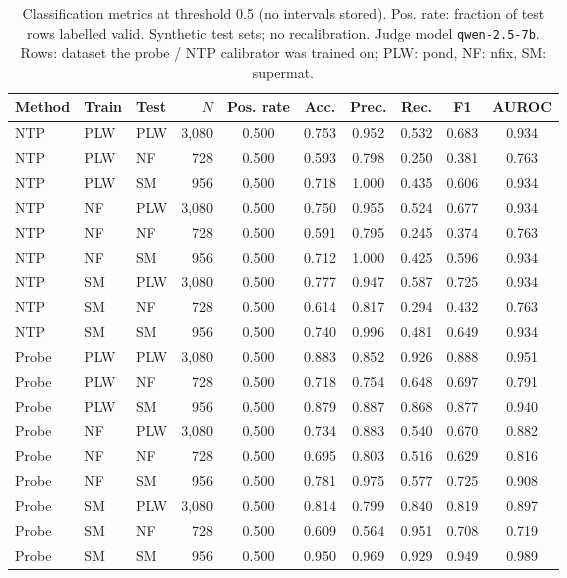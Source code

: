\begin{table}[t]
\centering
\small
\caption{Classification metrics at threshold 0.5 (no intervals stored). Pos. rate: fraction of test rows labelled valid. Synthetic test sets; no recalibration. Judge model \texttt{qwen-2.5-7b}. Rows: dataset the probe / NTP calibrator was trained on; PLW: pond, NF: nfix, SM: supermat.}
\label{tab:calibration-syn-classification}
\begin{tabular}{lllrcccccc}
\toprule
Method & Train & Test & $N$ & Pos. rate & Acc. & Prec. & Rec. & F1 & AUROC \\
\midrule
NTP & PLW & PLW & 3{,}080 & 0.500 & 0.753 & 0.952 & 0.532 & 0.683 & 0.934 \\
NTP & PLW & NF & 728 & 0.500 & 0.593 & 0.798 & 0.250 & 0.381 & 0.763 \\
NTP & PLW & SM & 956 & 0.500 & 0.718 & 1.000 & 0.435 & 0.606 & 0.934 \\
NTP & NF & PLW & 3{,}080 & 0.500 & 0.750 & 0.955 & 0.524 & 0.677 & 0.934 \\
NTP & NF & NF & 728 & 0.500 & 0.591 & 0.795 & 0.245 & 0.374 & 0.763 \\
NTP & NF & SM & 956 & 0.500 & 0.712 & 1.000 & 0.425 & 0.596 & 0.934 \\
NTP & SM & PLW & 3{,}080 & 0.500 & 0.777 & 0.947 & 0.587 & 0.725 & 0.934 \\
NTP & SM & NF & 728 & 0.500 & 0.614 & 0.817 & 0.294 & 0.432 & 0.763 \\
NTP & SM & SM & 956 & 0.500 & 0.740 & 0.996 & 0.481 & 0.649 & 0.934 \\
\midrule
Probe & PLW & PLW & 3{,}080 & 0.500 & 0.883 & 0.852 & 0.926 & 0.888 & 0.951 \\
Probe & PLW & NF & 728 & 0.500 & 0.718 & 0.754 & 0.648 & 0.697 & 0.791 \\
Probe & PLW & SM & 956 & 0.500 & 0.879 & 0.887 & 0.868 & 0.877 & 0.940 \\
Probe & NF & PLW & 3{,}080 & 0.500 & 0.734 & 0.883 & 0.540 & 0.670 & 0.882 \\
Probe & NF & NF & 728 & 0.500 & 0.695 & 0.803 & 0.516 & 0.629 & 0.816 \\
Probe & NF & SM & 956 & 0.500 & 0.781 & 0.975 & 0.577 & 0.725 & 0.908 \\
Probe & SM & PLW & 3{,}080 & 0.500 & 0.814 & 0.799 & 0.840 & 0.819 & 0.897 \\
Probe & SM & NF & 728 & 0.500 & 0.609 & 0.564 & 0.951 & 0.708 & 0.719 \\
Probe & SM & SM & 956 & 0.500 & 0.950 & 0.969 & 0.929 & 0.949 & 0.989 \\
\bottomrule
\end{tabular}
\end{table}
